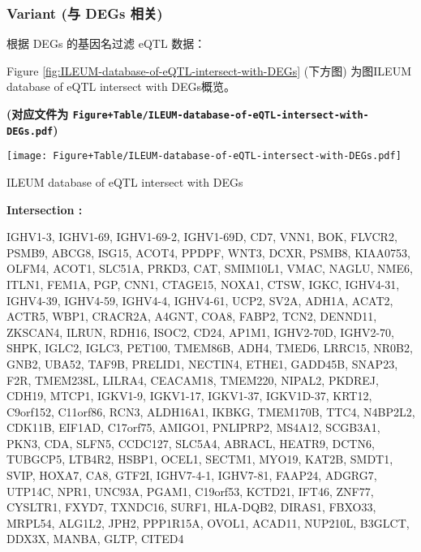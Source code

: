 \documentclass[
]{article}
\begin{document}
\hypertarget{variant-ux4e0e-degs-ux76f8ux5173-1}{%
\subsubsection{Variant (与 DEGs 相关)}\label{variant-ux4e0e-degs-ux76f8ux5173-1}}

根据 DEGs 的基因名过滤 eQTL 数据：

Figure \ref{fig:ILEUM-database-of-eQTL-intersect-with-DEGs} (下方图) 为图ILEUM database of eQTL intersect with DEGs概览。

\textbf{(对应文件为 \texttt{Figure+Table/ILEUM-database-of-eQTL-intersect-with-DEGs.pdf})}

\def\@captype{figure}
\begin{center}
\texttt{[image: Figure+Table/ILEUM-database-of-eQTL-intersect-with-DEGs.pdf]}
\caption{ILEUM database of eQTL intersect with DEGs}\label{fig:ILEUM-database-of-eQTL-intersect-with-DEGs}
\end{center}
\begin{center}\begin{tcolorbox}[colback=gray!10, colframe=gray!50, width=0.9\linewidth, arc=1mm, boxrule=0.5pt]
\textbf{
Intersection
:}

\vspace{0.5em}

    IGHV1-3, IGHV1-69, IGHV1-69-2, IGHV1-69D, CD7, VNN1,
BOK, FLVCR2, PSMB9, ABCG8, ISG15, ACOT4, PPDPF, WNT3, DCXR,
PSMB8, KIAA0753, OLFM4, ACOT1, SLC51A, PRKD3, CAT,
SMIM10L1, VMAC, NAGLU, NME6, ITLN1, FEM1A, PGP, CNN1,
CTAGE15, NOXA1, CTSW, IGKC, IGHV4-31, IGHV4-39, IGHV4-59,
IGHV4-4, IGHV4-61, UCP2, SV2A, ADH1A, ACAT2, ACTR5, WBP1,
CRACR2A, A4GNT, COA8, FABP2, TCN2, DENND11, ZKSCAN4, ILRUN,
RDH16, ISOC2, CD24, AP1M1, IGHV2-70D, IGHV2-70, SHPK,
IGLC2, IGLC3, PET100, TMEM86B, ADH4, TMED6, LRRC15, NR0B2,
GNB2, UBA52, TAF9B, PRELID1, NECTIN4, ETHE1, GADD45B,
SNAP23, F2R, TMEM238L, LILRA4, CEACAM18, TMEM220, NIPAL2,
PKDREJ, CDH19, MTCP1, IGKV1-9, IGKV1-17, IGKV1-37,
IGKV1D-37, KRT12, C9orf152, C11orf86, RCN3, ALDH16A1,
IKBKG, TMEM170B, TTC4, N4BP2L2, CDK11B, EIF1AD, C17orf75,
AMIGO1, PNLIPRP2, MS4A12, SCGB3A1, PKN3, CDA, SLFN5,
CCDC127, SLC5A4, ABRACL, HEATR9, DCTN6, TUBGCP5, LTB4R2,
HSBP1, OCEL1, SECTM1, MYO19, KAT2B, SMDT1, SVIP, HOXA7,
CA8, GTF2I, IGHV7-4-1, IGHV7-81, FAAP24, ADGRG7, UTP14C,
NPR1, UNC93A, PGAM1, C19orf53, KCTD21, IFT46, ZNF77,
CYSLTR1, FXYD7, TXNDC16, SURF1, HLA-DQB2, DIRAS1, FBXO33,
MRPL54, ALG1L2, JPH2, PPP1R15A, OVOL1, ACAD11, NUP210L,
B3GLCT, DDX3X, MANBA, GLTP, CITED4

\vspace{2em}
\end{tcolorbox}
\end{center}
\end{document}
